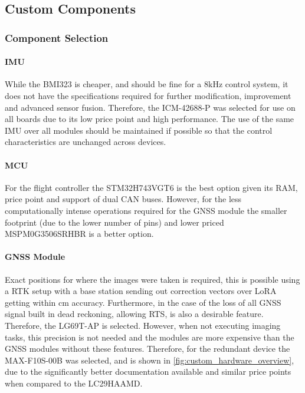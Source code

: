 \subsection{Custom Components}

\subsubsection{Component Selection}

\paragraph{\gls{IMU}}
While the BMI323 is cheaper, and should be fine for a 8kHz control system, it does not have the specifications required for further modification, improvement and advanced sensor fusion. Therefore, the ICM-42688-P was selected for use on all boards due to its low price point and high performance. The use of the same \gls{IMU} over all modules should be maintained if possible so that the control characteristics are unchanged across devices.
\paragraph{\gls{MCU}}
For the flight controller the STM32H743VGT6 is the best option given its \gls{RAM}, price point and support of dual \gls{CAN} buses. However, for the less computationally intense operations required for the \gls{GNSS} module the smaller footprint (due to the lower number of pins) and lower priced MSPM0G3506SRHBR is a better option.
\paragraph{\gls{GNSS} Module}
Exact positions for where the images were taken is required, this is possible using a \gls{RTK} setup with a base station sending out correction vectors over LoRA getting within cm accuracy\cite{RTK_LORA}. Furthermore, in the case of the loss of all \gls{GNSS} signal built in dead reckoning, allowing \gls{RTS}, is also a desirable feature. Therefore, the LG69T-AP is selected. However, when not executing imaging tasks, this precision is not needed and the modules are more expensive than the \gls{GNSS} modules without these features. Therefore, for the redundant device the MAX-F10S-00B was selected, and is shown in \ref{fig:custom_hardware_overview}, due to the significantly better documentation available and similar price points when compared to the LC29HAAMD.

